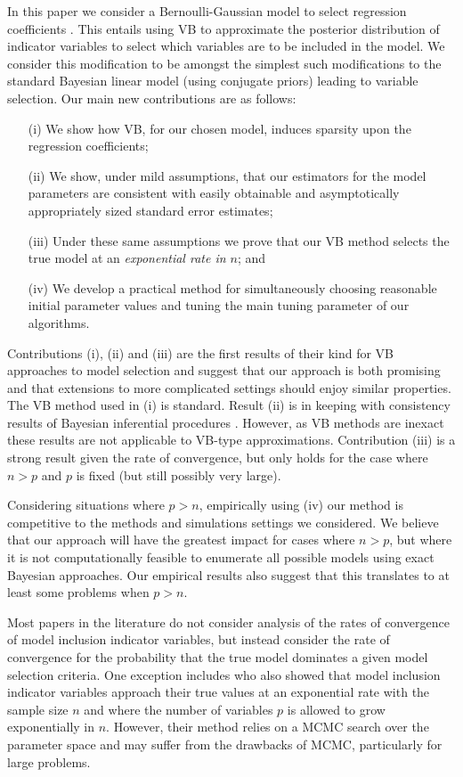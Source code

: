 \documentclass[11pt]{article}
\newtheorem{Main Result}{Main Result}
\newcommand{\joc}[1]{{\color{black}#1}}
\begin{document}
In this paper we consider a Bernoulli-Gaussian model to select regression coefficients 
\citep[see][]{Soussen2011}. This entails using VB to approximate the posterior distribution of indicator variables to select which variables are to be included in the model. We consider this modification to be amongst the simplest such modifications
to the standard Bayesian linear model (using conjugate priors) leading
to variable selection. Our main new contributions are as follows:
\begin{itemize}
\item[(i)] We show how VB, \joc{for our chosen model}, induces sparsity upon the regression
coefficients;

\item[(ii)] We show, under mild assumptions, that our estimators for the model
parameters are consistent with easily obtainable and \joc{asymptotically} appropriately sized
standard error estimates;  

\item [(iii)] Under these same assumptions we prove that 
our VB method selects the true model
at an {\it exponential rate in $n$}; and

\item[(iv)] We develop a practical method for simultaneously choosing reasonable
initial parameter values and tuning the main tuning parameter of our algorithms.
\end{itemize}




\noindent Contributions (i), (ii) and (iii) are the first results of their
kind for VB approaches to model selection and suggest that our approach is
both promising and that extensions to more complicated settings should
enjoy similar properties. \joc{The VB method used in (i) is standard}.
Result (ii) is in keeping with consistency results
of Bayesian inferential procedures \citep{CasellaEtal2009}.
However, as VB methods are inexact these results are not applicable to VB-type 
approximations. Contribution (iii) is a \joc{strong} result given the
rate of convergence, but only holds for
the case where $n>p$ and $p$ is fixed (but still possibly very large). 
\joc{Considering situations where $p>n$, empirically using (iv) our method is competitive to the methods and simulations settings we considered.
We believe that our approach will have the greatest impact for cases where
$n>p$, but where it is not computationally feasible to enumerate all possible
models using exact Bayesian approaches.
Our empirical results also suggest that this translates to at least
some problems when  $p>n$. 


Most papers in the literature do not consider analysis of the rates of convergence
of model inclusion indicator variables, but instead consider the rate of
convergence for the probability that the true model dominates a given
model selection criteria. One exception includes \cite{NarisettyHe2014} who
also showed that model inclusion indicator variables approach their true values
at an exponential rate with the sample size $n$ and where the number of variables
$p$ is allowed to grow exponentially in $n$. However, their method relies on
a MCMC search over the parameter space and may suffer from the drawbacks
of MCMC, particularly for large problems.}
\end{document}
